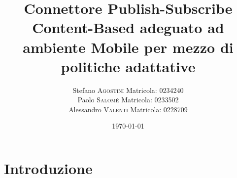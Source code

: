 \documentclass{article}
\title{Connettore Publish-Subscribe Content-Based adeguato ad ambiente Mobile per mezzo di politiche adattative } %
\author{Stefano \textsc{Agostini} Matricola: 0234240 \\ Paolo \textsc{Salom\'e} Matricola: 0233502 \\ Alessandro \textsc{Valenti} Matricola: 0228709} %
\date{\today} %
\begin{document}

\maketitle %

\newpage

\tableofcontents

\newpage




\section{Introduzione}
\end{document}
